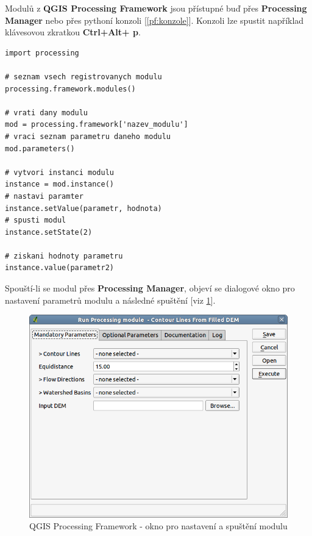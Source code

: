 Modulů z \textbf{QGIS Processing Framework} jsou přístupné buď přes \textbf{Processing Manager} nebo přes pythoní konzoli [\autoref{pf:konzole}]. Konzoli lze spustit například klávesovou zkratkou \textbf{Ctrl+Alt+ p}. 
\newpage

\begin{lstlisting}[label=pf:konzole,caption={Přístup k modulům přes konzoli.}] 
import processing

# seznam vsech registrovanych modulu
processing.framework.modules()
	
# vrati dany modulu
mod = processing.framework['nazev_modulu']
# vraci seznam parametru daneho modulu
mod.parameters()

# vytvori instanci modulu
instance = mod.instance()
# nastavi paramter
instance.setValue(parametr, hodnota)
# spusti modul
instance.setState(2)

# ziskani hodnoty parametru
instance.value(parametr2)
\end{lstlisting}

Spouští-li se modul přes \textbf{Processing Manager}, objeví se
dialogové okno pro nastavení parametrů modulu a následné spuštění
[viz \figurename \ref{pf:dialog}].

\begin{figure}[!]
	\centering
	\includegraphics[scale=0.5]{pictures/pf/processing_dialog}
	\caption{QGIS Processing Framework - okno pro nastavení a spuštění modulu}
  	\label{pf:dialog}
\end{figure}

\newpage
